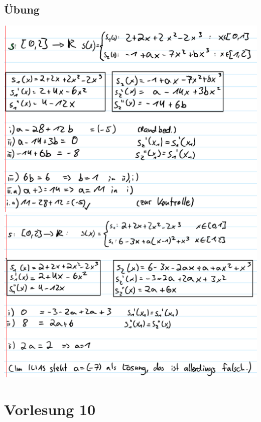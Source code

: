 \documentclass[]{article}
\begin{document}
\subsection{Übung}
	\includegraphics[width=\textwidth]{res/vl9-1.png}
	\includegraphics[width=\textwidth]{res/vl9-2.png}	

\section{Vorlesung 10}
\end{document}

